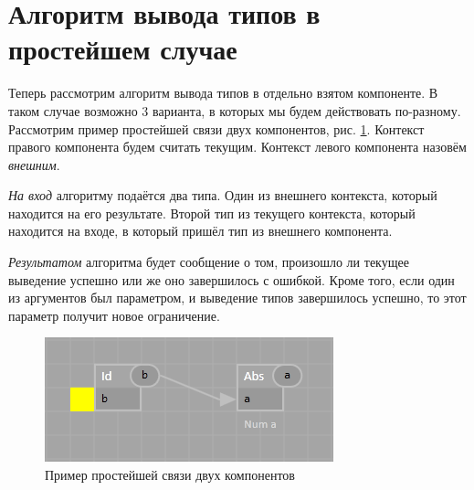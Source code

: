 \section{Алгоритм вывода типов в простейшем случае}
Теперь рассмотрим алгоритм вывода типов в отдельно взятом компоненте. В таком случае возможно 3 варианта, в которых мы будем действовать по-разному. Рассмотрим пример простейшей связи двух компонентов, рис. \ref{connection}. Контекст правого компонента будем считать текущим. Контекст левого компонента назовём \textit{внешним}.

\textit{На вход} алгоритму подаётся два типа. Один из внешнего контекста, который находится на его результате. Второй тип из текущего контекста, который находится на входе, в который пришёл тип из внешнего компонента.

\textit{Результатом} алгоритма будет сообщение о том, произошло ли текущее выведение успешно или же оно завершилось с ошибкой. Кроме того, если один из аргументов был параметром, и выведение типов завершилось успешно, то этот параметр получит новое ограничение.

\begin{figure}
\centering
\includegraphics{img/connection.PNG}
\caption{Пример простейшей связи двух компонентов}\label{connection}
\end{figure}
